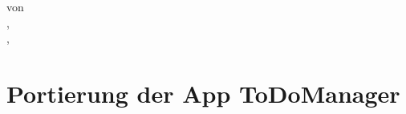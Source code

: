 \documentclass[
paper=a4, 
fontsize=11pt, 
parskip, 
]{scrartcl}	%
\author{Dominic Dahnelt}
\numberwithin{equation}{section}															%
\numberwithin{figure}{section}																%
\numberwithin{table}{section}																%
\newcommand{\coverpage}{
	\begin{titlepage}
		\vspace{-2cm}		
		
		\begin{center}
			\LARGE{\textsc{\the\college}}\\
			\Large{\textsc{\the\engcollege}}\\
			\vspace{1cm}
			\Large{\textsc{\the\fachbereich}\\
				\textsc{\the\studiengang}}\\
			\vspace{1cm}
			\Large{	\textsc{\the\modul} \\
			\the\semester}\\
			\vspace{2.5cm}\Huge\normalfont

			\the\myTitle	\\
			\vspace{1cm}\large{von}\\
			
			\emph{\the\bearbeiter}, \the\matrikelnr\\
			\emph{\the\secondBearbeiter}, \the\secondMatrikelnr
			
			\vspace{1cm}\large
		\end{center}
		\vspace{\fill}\normalsize
	\end{titlepage}
}
\begin{document}
\coverpage
\tableofcontents
\pagebreak
\section{Portierung der App ToDoManager}
\end{document}
